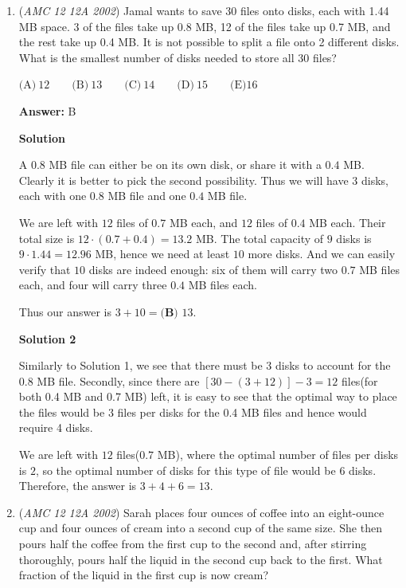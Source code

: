 \begin{enumerate}
 Because this is the same as the area of triangles, you get: $\boxed{\textbf{(A) }B=W}$.

 -N.

 


	\item (\textit{AMC 12 12A 2002}) Jamal wants to save 30 files onto disks, each with 1.44 MB space. 3 of the files take up 0.8 MB, 12 of the files take up 0.7 MB, and the rest take up 0.4 MB. It is not possible to split a file onto 2 different disks. What is the smallest number of disks needed to store all 30 files?


 $\text{(A)}\ 12 \qquad \text{(B)}\ 13 \qquad \text{(C)}\ 14 \qquad \text{(D)}\ 15 \qquad \text{(E)} 16$

 \textbf{Answer: }B



\textbf{Solution}

A $0.8$ MB file can either be on its own disk, or share it with a $0.4$ MB. Clearly it is better to pick the second possibility. Thus we will have $3$ disks, each with one $0.8$ MB file and one $0.4$ MB file.

 We are left with $12$ files of $0.7$ MB each, and $12$ files of $0.4$ MB each. Their total size is $12\cdot (0.7 + 0.4) = 13.2$ MB. The total capacity of $9$ disks is $9\cdot 1.44 = 12.96$ MB, hence we need at least $10$ more disks. And we can easily verify that $10$ disks are indeed enough: six of them will carry two $0.7$ MB files each, and four will carry three $0.4$ MB files each.

 Thus our answer is $3+10 = \boxed{\textbf{(B) }13 }$.

 



\textbf{Solution 2}

Similarly to Solution 1, we see that there must be $3$ disks to account for the $0.8$ MB file. Secondly, since there are $[30-(3+12)]-3 = 12$ files(for both 0.4 MB and 0.7 MB) left, it is easy to see that the optimal way to place the files would be $3$ files per disks for the 0.4 MB files and hence would require 4 disks. 

 We are left with $12$ files($0.7$ MB), where the optimal number of files per disks is $2$, so the optimal number of disks for this type of file would be $6$ disks. Therefore, the answer is $3+4+6=\boxed{13}$.

 


	\item (\textit{AMC 12 12A 2002}) Sarah places four ounces of coffee into an eight-ounce cup and four ounces of cream into a second cup of the same size. She then pours half the coffee from the first cup to the second and, after stirring thoroughly, pours half the liquid in the second cup back to the first. What fraction of the liquid in the first cup is now cream?



\end{enumerate}
